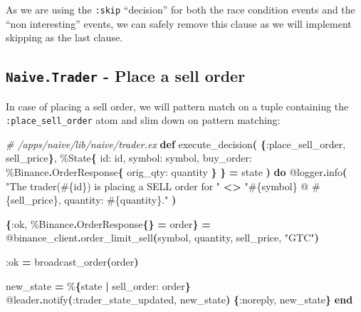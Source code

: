 \documentclass[
  oneside]{book}
\newenvironment{Shaded}{\begin{snugshade}}{\end{snugshade}}
\newcommand{\CommentTok}[1]{\textcolor[rgb]{0.56,0.35,0.01}{\textit{#1}}}
\newcommand{\ConstantTok}[1]{\textcolor[rgb]{0.56,0.35,0.01}{#1}}
\newcommand{\FunctionTok}[1]{\textcolor[rgb]{0.13,0.29,0.53}{\textbf{#1}}}
\newcommand{\KeywordTok}[1]{\textcolor[rgb]{0.13,0.29,0.53}{\textbf{#1}}}
\newcommand{\NormalTok}[1]{#1}
\newcommand{\OperatorTok}[1]{\textcolor[rgb]{0.81,0.36,0.00}{\textbf{#1}}}
\newcommand{\OtherTok}[1]{\textcolor[rgb]{0.56,0.35,0.01}{#1}}
\newcommand{\StringTok}[1]{\textcolor[rgb]{0.31,0.60,0.02}{#1}}
\newcommand{\VariableTok}[1]{\textcolor[rgb]{0.00,0.00,0.00}{#1}}
\begin{document}
As we are using the \texttt{:skip} ``decision'' for both the race condition events and the ``non interesting'' events, we can safely remove this clause as we will implement skipping as the last clause.

\subsection{\texorpdfstring{\texttt{Naive.Trader} - Place a sell order}{Naive.Trader - Place a sell order}}\label{naive.trader---place-a-sell-order}

In case of placing a sell order, we will pattern match on a tuple containing the \texttt{:place\_sell\_order} atom and slim down on pattern matching:

\begin{Shaded}
\begin{Highlighting}[]
\CommentTok{\# /apps/naive/lib/naive/trader.ex}
  \KeywordTok{def}\NormalTok{ execute\_decision}\FunctionTok{(}
         \FunctionTok{\{}\VariableTok{:place\_sell\_order}\NormalTok{, sell\_price}\FunctionTok{\}}\NormalTok{,}
\NormalTok{         \%}\ConstantTok{State}\FunctionTok{\{}
           \VariableTok{id:}\NormalTok{ id,}
           \VariableTok{symbol:}\NormalTok{ symbol,}
           \VariableTok{buy\_order:}\NormalTok{ \%}\ConstantTok{Binance}\OperatorTok{.}\ConstantTok{OrderResponse}\FunctionTok{\{}
             \VariableTok{orig\_qty:}\NormalTok{ quantity}
           \FunctionTok{\}}
         \FunctionTok{\}} \OperatorTok{=}\NormalTok{ state}
       \FunctionTok{)} \KeywordTok{do}
    \OtherTok{@logger}\OperatorTok{.}\NormalTok{info}\FunctionTok{(}
      \StringTok{"The trader(}\OtherTok{\#\{}\NormalTok{id}\OtherTok{\}}\StringTok{) is placing a SELL order for "} \OperatorTok{\textless{}\textgreater{}}
        \StringTok{"}\OtherTok{\#\{}\NormalTok{symbol}\OtherTok{\}}\StringTok{ @ }\OtherTok{\#\{}\NormalTok{sell\_price}\OtherTok{\}}\StringTok{, quantity: }\OtherTok{\#\{}\NormalTok{quantity}\OtherTok{\}}\StringTok{."}
    \FunctionTok{)}

    \FunctionTok{\{}\VariableTok{:ok}\NormalTok{, \%}\ConstantTok{Binance}\OperatorTok{.}\ConstantTok{OrderResponse}\FunctionTok{\{\}} \OperatorTok{=}\NormalTok{ order}\FunctionTok{\}} \OperatorTok{=}
      \OtherTok{@binance\_client}\OperatorTok{.}\NormalTok{order\_limit\_sell}\FunctionTok{(}\NormalTok{symbol, quantity, sell\_price, }\StringTok{"GTC"}\FunctionTok{)}

    \VariableTok{:ok} \OperatorTok{=}\NormalTok{ broadcast\_order}\FunctionTok{(}\NormalTok{order}\FunctionTok{)}

\NormalTok{    new\_state }\OperatorTok{=}\NormalTok{ \%}\FunctionTok{\{}\NormalTok{state }\OperatorTok{|} \VariableTok{sell\_order:}\NormalTok{ order}\FunctionTok{\}}
    \OtherTok{@leader}\OperatorTok{.}\NormalTok{notify}\FunctionTok{(}\VariableTok{:trader\_state\_updated}\NormalTok{, new\_state}\FunctionTok{)}
    \FunctionTok{\{}\VariableTok{:noreply}\NormalTok{, new\_state}\FunctionTok{\}}
  \KeywordTok{end}
\end{Highlighting}
\end{Shaded}
\end{document}
